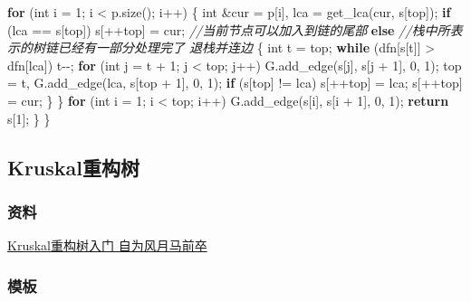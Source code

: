\documentclass[
]{article}
\newenvironment{Shaded}{}{}
\newcommand{\CommentTok}[1]{\textcolor[rgb]{0.38,0.63,0.69}{\textit{#1}}}
\newcommand{\ControlFlowTok}[1]{\textcolor[rgb]{0.00,0.44,0.13}{\textbf{#1}}}
\newcommand{\DataTypeTok}[1]{\textcolor[rgb]{0.56,0.13,0.00}{#1}}
\newcommand{\DecValTok}[1]{\textcolor[rgb]{0.25,0.63,0.44}{#1}}
\newcommand{\NormalTok}[1]{#1}
\begin{document}
\begin{Shaded}
\begin{Highlighting}[]
        \ControlFlowTok{for}\NormalTok{ (}\DataTypeTok{int}\NormalTok{ i = }\DecValTok{1}\NormalTok{; i \textless{} p.size(); i++)}
\NormalTok{        \{}
            \DataTypeTok{int}\NormalTok{ \&cur = p[i], lca = get\_lca(cur, s[top]);}
            \ControlFlowTok{if}\NormalTok{ (lca == s[top]) s[++top] = cur; }\CommentTok{//当前节点可以加入到链的尾部}
            \ControlFlowTok{else} \CommentTok{//栈中所表示的树链已经有一部分处理完了 退栈并连边}
\NormalTok{            \{}
                \DataTypeTok{int}\NormalTok{ t = top;}
                \ControlFlowTok{while}\NormalTok{ (dfn[s[t]] \textgreater{} dfn[lca]) t{-}{-};}
                \ControlFlowTok{for}\NormalTok{ (}\DataTypeTok{int}\NormalTok{ j = t + }\DecValTok{1}\NormalTok{; j \textless{} top; j++)}
\NormalTok{                    G.add\_edge(s[j], s[j + }\DecValTok{1}\NormalTok{], }\DecValTok{0}\NormalTok{, }\DecValTok{1}\NormalTok{);}
\NormalTok{                top = t, G.add\_edge(lca, s[top + }\DecValTok{1}\NormalTok{], }\DecValTok{0}\NormalTok{, }\DecValTok{1}\NormalTok{);}
                \ControlFlowTok{if}\NormalTok{ (s[top] != lca) s[++top] = lca;}
\NormalTok{                s[++top] = cur;}
\NormalTok{            \}}
\NormalTok{        \}}
        \ControlFlowTok{for}\NormalTok{ (}\DataTypeTok{int}\NormalTok{ i = }\DecValTok{1}\NormalTok{; i \textless{} top; i++)}
\NormalTok{            G.add\_edge(s[i], s[i + }\DecValTok{1}\NormalTok{], }\DecValTok{0}\NormalTok{, }\DecValTok{1}\NormalTok{);}
        \ControlFlowTok{return}\NormalTok{ s[}\DecValTok{1}\NormalTok{];}
\NormalTok{    \}}
\NormalTok{\}}
\end{Highlighting}
\end{Shaded}

\hypertarget{kruskalux91cdux6784ux6811}{%
\subsection{Kruskal重构树}\label{kruskalux91cdux6784ux6811}}

\hypertarget{ux8d44ux6599-8}{%
\subsubsection{资料}\label{ux8d44ux6599-8}}

\href{https://www.cnblogs.com/zwfymqz/p/9683523.html}{Kruskal重构树入门
自为风月马前卒}

\hypertarget{ux6a21ux677f-15}{%
\subsubsection{模板}\label{ux6a21ux677f-15}}
\end{document}
